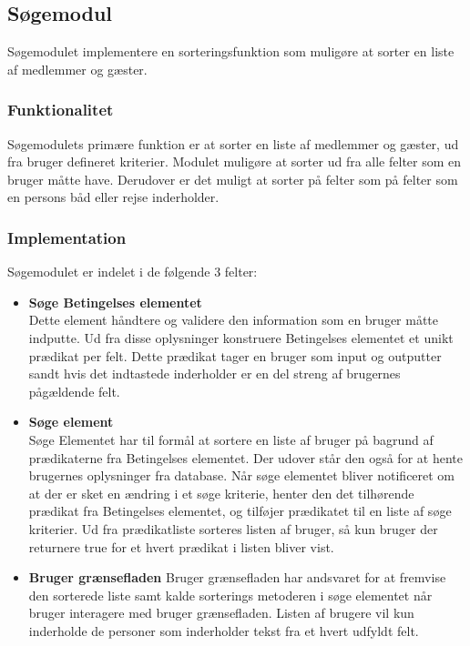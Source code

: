 \subsection{Søgemodul}
\label{sub:s_searchmodul}

Søgemodulet implementere en sorteringsfunktion som muligøre at sorter en liste af medlemmer og gæster. 
\subsubsection{Funktionalitet}
\label{sub:funktionalitet}

Søgemodulets primære funktion er at sorter en liste af medlemmer og gæster, ud fra bruger defineret kriterier. Modulet muligøre at sorter ud fra alle felter som en bruger måtte have. Derudover er det muligt at sorter på felter som på felter som en persons båd eller rejse inderholder. 

\subsubsection{Implementation}
\label{sub:implementation}

Søgemodulet er indelet i de følgende 3 felter:

\begin{itemize}
	\item \textbf{Søge Betingelses elementet} \\
		Dette element håndtere og validere den information som en bruger måtte indputte. Ud fra disse oplysninger konstruere Betingelses elementet et unikt prædikat per felt. Dette prædikat tager en bruger som input og outputter sandt hvis det indtastede inderholder er en del streng af brugernes pågældende felt. 
	\item \textbf{Søge element} \\
		Søge Elementet har til formål at sortere en liste af bruger på bagrund af prædikaterne fra Betingelses elementet. Der udover står den også for at hente brugernes oplysninger fra database. 
		Når søge elementet bliver notificeret om at der er sket en ændring i et søge kriterie, henter den det tilhørende prædikat fra Betingelses elementet, og tilføjer prædikatet til en liste af søge kriterier. Ud fra prædikatliste sorteres listen af bruger, så kun bruger der returnere true for et hvert prædikat i listen bliver vist. 

	\item \textbf{Bruger grænsefladen}
		Bruger grænsefladen har andsvaret for at fremvise den sorterede liste samt kalde sorterings metoderen i søge elementet når bruger interagere med bruger grænsefladen. Listen af brugere vil kun inderholde de personer som inderholder tekst fra et hvert udfyldt felt.
\end{itemize}



